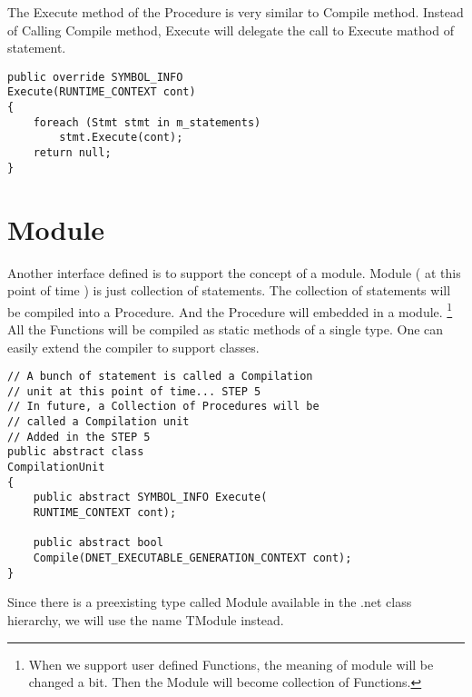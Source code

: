 The Execute method of the Procedure is very similar to Compile method. Instead of Calling Compile method, Execute will delegate the call to Execute mathod of statement.

\lstset{style=csharp}
\begin{lstlisting}
public override SYMBOL_INFO 
Execute(RUNTIME_CONTEXT cont)
{
	foreach (Stmt stmt in m_statements)
		stmt.Execute(cont);
	return null;
}
\end{lstlisting}

\section{Module}
Another interface defined is to support the concept of a module. Module ( at this point of time ) is just collection of
statements. The collection of statements will be compiled into a Procedure. And the Procedure will embedded in a module.
\footnote{When we support user defined Functions, the meaning of module will be changed a bit. Then the Module will become
collection of Functions.} All the Functions will be compiled as static methods of a single type. One can easily extend the
compiler to support classes.

\lstset{style=csharp}
\begin{lstlisting}
// A bunch of statement is called a Compilation
// unit at this point of time... STEP 5
// In future, a Collection of Procedures will be
// called a Compilation unit
// Added in the STEP 5
public abstract class 
CompilationUnit
{
	public abstract SYMBOL_INFO Execute(
	RUNTIME_CONTEXT cont);

	public abstract bool 
	Compile(DNET_EXECUTABLE_GENERATION_CONTEXT cont);
}
\end{lstlisting}
Since there is a preexisting type called Module available in the .net class hierarchy, we will use the name TModule instead.


